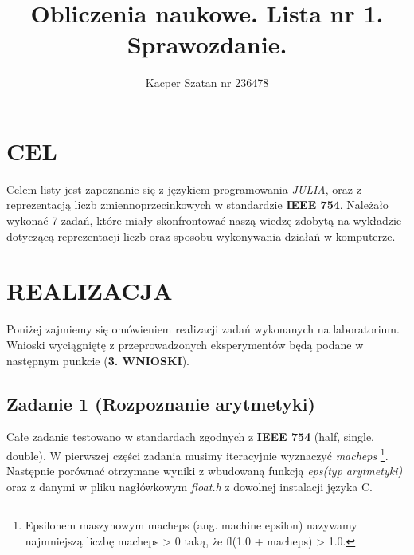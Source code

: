 \documentclass[]{article}
\title{Obliczenia naukowe. Lista nr 1. Sprawozdanie.}
\author{Kacper Szatan nr 236478}
\begin{document}
\maketitle
\section{CEL}
Celem listy jest zapoznanie się z językiem programowania \textit{JULIA}, oraz z reprezentacją liczb zmiennoprzecinkowych w standardzie \textbf{IEEE 754}. Należało wykonać 7 zadań, które miały skonfrontować naszą wiedzę zdobytą na wykładzie dotyczącą reprezentacji liczb oraz sposobu wykonywania działań w komputerze.
\section{REALIZACJA}
Poniżej zajmiemy się omówieniem realizacji zadań wykonanych na laboratorium. Wnioski wyciągniętę z przeprowadzonych eksperymentów będą podane w następnym punkcie (\textbf{3. WNIOSKI}).   
\subsection{Zadanie 1 (Rozpoznanie arytmetyki)}
Całe zadanie testowano w standardach zgodnych z \textbf{IEEE 754} (half, single, double). W pierwszej części zadania musimy iteracyjnie wyznaczyć \textit{macheps} \footnote{Epsilonem maszynowym macheps (ang. machine epsilon) nazywamy najmniejszą liczbę macheps > 0 taką, że fl(1.0 + macheps) > 1.0.}. Następnie porównać otrzymane wyniki z wbudowaną funkcją \textit{eps(typ arytmetyki)} oraz z danymi w pliku nagłówkowym \textit{float.h} z dowolnej instalacji języka C.
\end{document}
